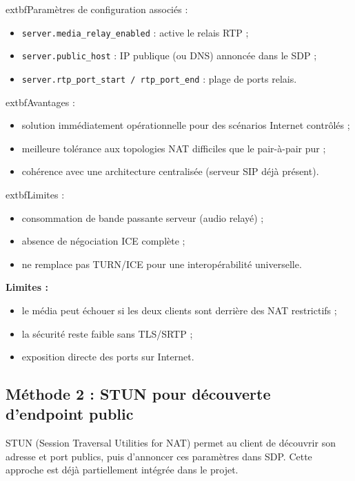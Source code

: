 \documentclass[12pt,a4paper]{article}
\begin{document}
	extbf{Paramètres de configuration associés :}
\begin{itemize}[leftmargin=1.2cm]
    \item \texttt{server.media\_relay\_enabled} : active le relais RTP ;
    \item \texttt{server.public\_host} : IP publique (ou DNS) annoncée dans le SDP ;
    \item \texttt{server.rtp\_port\_start / rtp\_port\_end} : plage de ports relais.
\end{itemize}

	extbf{Avantages :}
\begin{itemize}[leftmargin=1.2cm]
    \item solution immédiatement opérationnelle pour des scénarios Internet contrôlés ;
    \item meilleure tolérance aux topologies NAT difficiles que le pair-à-pair pur ;
    \item cohérence avec une architecture centralisée (serveur SIP déjà présent).
\end{itemize}

	extbf{Limites :}
\begin{itemize}[leftmargin=1.2cm]
    \item consommation de bande passante serveur (audio relayé) ;
    \item absence de négociation ICE complète ;
    \item ne remplace pas TURN/ICE pour une interopérabilité universelle.
\end{itemize}

	\textbf{Limites :}
\begin{itemize}[leftmargin=1.2cm]
    \item le média peut échouer si les deux clients sont derrière des NAT restrictifs ;
    \item la sécurité reste faible sans TLS/SRTP ;
    \item exposition directe des ports sur Internet.
\end{itemize}

\subsection{Méthode 2 : STUN pour découverte d'endpoint public}

STUN (Session Traversal Utilities for NAT) permet au client de découvrir son adresse et port publics, puis d'annoncer ces paramètres dans SDP. Cette approche est déjà partiellement intégrée dans le projet.
\end{document}
